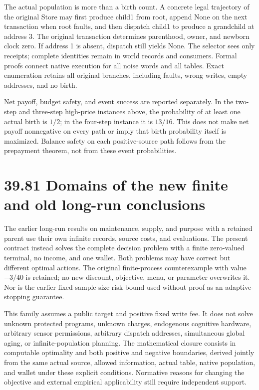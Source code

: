 \documentclass[
  english,
  11pt,
  oneside]{book}
\begin{document}
The actual population is more than a birth count. A concrete legal trajectory of the original Store may first produce child1 from root, append None on the next transaction when root faults, and then dispatch child1 to produce a grandchild at address 3. The original transaction determines parenthood, owner, and newborn clock zero. If address 1 is absent, dispatch still yields None. The selector sees only receipts; complete identities remain in world records and consumers. Formal proofs connect native execution for all noise words and all tables. Exact enumeration retains all original branches, including faults, wrong writes, empty addresses, and no birth.

Net payoff, budget safety, and event success are reported separately. In the two-step and three-step high-price instances above, the probability of at least one actual birth is \(1/2\); in the four-step instance it is \(13/16\). This does not make net payoff nonnegative on every path or imply that birth probability itself is maximized. Balance safety on each positive-source path follows from the prepayment theorem, not from these event probabilities.

\section{39.81 Domains of the new finite and old long-run conclusions}\label{domains-of-the-new-finite-and-old-long-run-conclusions}

The earlier long-run results on maintenance, supply, and purpose with a retained parent use their own infinite records, source costs, and evaluations. The present contract instead solves the complete decision problem with a finite zero-valued terminal, no income, and one wallet. Both problems may have correct but different optimal actions. The original finite-process counterexample with value \(-3/40\) is retained; no new discount, objective, menu, or parameter overwrites it. Nor is the earlier fixed-sample-size risk bound used without proof as an adaptive-stopping guarantee.

This family assumes a public target and positive fixed write fee. It does not solve unknown protected programs, unknown charges, endogenous cognitive hardware, arbitrary sensor permissions, arbitrary dispatch addresses, simultaneous global aging, or infinite-population planning. The mathematical closure consists in computable optimality and both positive and negative boundaries, derived jointly from the same actual source, allowed information, actual table, native population, and wallet under these explicit conditions. Normative reasons for changing the objective and external empirical applicability still require independent support.
\end{document}
